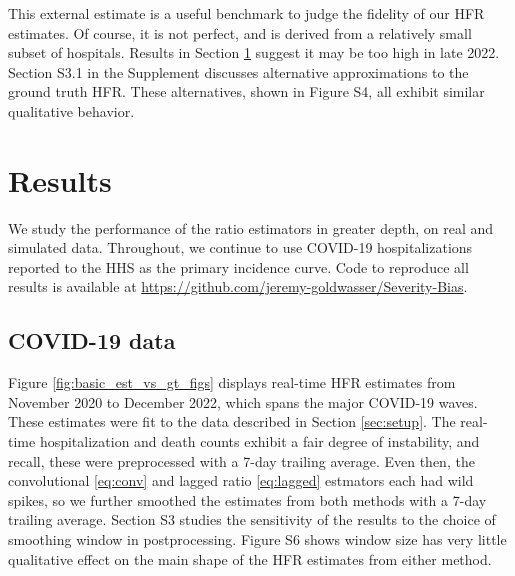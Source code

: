 \documentclass{article}
\begin{document}
This external estimate is a useful benchmark to judge the fidelity of our HFR
estimates. Of course, it is not perfect, and is derived from a relatively small
subset of hospitals. Results in Section \ref{sec:results} suggest it may be too
high in late 2022. 
Section S3.1 in the Supplement discusses alternative
approximations to the ground truth HFR. 
These alternatives, shown in Figure S4, all exhibit similar qualitative behavior. 

\section{Results}
\label{sec:results}

We study the performance of the ratio estimators in greater depth, on real and 
simulated data. Throughout, we continue to use COVID-19 hospitalizations
reported to the HHS as the primary incidence curve. Code to reproduce all
results is available at
\url{https://github.com/jeremy-goldwasser/Severity-Bias}.            

\subsection{COVID-19 data}
\label{sec:results_real}

Figure \ref{fig:basic_est_vs_gt_figs} displays real-time HFR estimates from
November 2020 to December 2022, which spans the major COVID-19 waves. These
estimates were fit to the data described in Section \ref{sec:setup}. The
real-time hospitalization and death counts exhibit a fair degree of instability,
and recall, these were preprocessed with a 7-day trailing average. Even then,
the convolutional \eqref{eq:conv} and lagged ratio \eqref{eq:lagged} estmators
each had wild spikes, so we further smoothed the estimates from both methods
with a 7-day trailing average. 
Section S3 studies the
sensitivity of the results to the choice of smoothing window in postprocessing.
Figure S6 shows window size has very little qualitative effect on the main shape of the HFR estimates from either method. 
\end{document}
